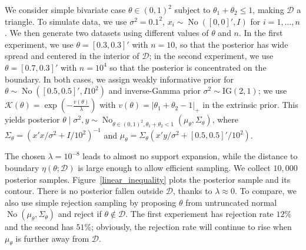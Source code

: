 \documentclass[10pt]{article}
\newcommand{\mc}[1]{\mathcal{#1}}
\DeclareMathOperator{\No}{No}
\DeclareMathOperator{\1}{\mathbbm{1}}
\begin{document}
We consider simple bivariate case $\theta \in (0,1)^2$ subject to $\theta_1+\theta_2\le 1$, making $\mc D$ a triangle. To simulate data, we use $\sigma^2=0.1^2$, $x_i\sim \No([0,0]',I)$ for $i=1,\ldots,n$. We then generate two datasets using different values of $\theta$ and $n$. In the first experiment, we use $\theta=[0.3,0.3]'$ with $n=10$, so that the posterior has wide spread and centered in the interior of $\mc D$; in the second experiment, we use $\theta=[0.7,0.3]'$ with $n=10^4$ so that the posterior is concentrated on the boundary. In both cases, we assign weakly informative prior for $\theta\sim \No([0.5, 0.5]',I10^2)$ and inverse-Gamma prior $\sigma^2\sim \text{IG}(2,1)$; we use $\mc K(\theta)=\exp( - \frac{v(\theta)}{\lambda})$ with $v(\theta)=|\theta_1+\theta_2-1|_{+}$ in the extrinsic prior. This yields posterior $\theta\mid \sigma^2,y \sim \No_{\theta\in(0,1)^2,\theta_1+\theta_2<1} \left( \mu_\theta, \Sigma_\theta\right)$, where $\Sigma_\theta=(x'x/\sigma^2+I/10^2)^{-1}$ and $\mu_\theta= \Sigma_\theta(x'y/\sigma^2 + [0.5,0.5]'/10^2)$. 

The chosen $\lambda=10^{-8}$ leads to almost no support expansion, while the distance to boundary $\eta(\theta;\mc D)$ is large enough to allow efficient sampling. We collect $10,000$ posterior samples. Figure~\ref{linear_inequality} plots the posterior sample and its contour. There is no posterior fallen outside $\mc D$, thanks to $\lambda\approx 0$. To compare, we also use simple rejection sampling by proposing $\theta$ from untruncated normal $\No \left( \mu_\theta, \Sigma_\theta\right)$ and reject if $\theta\not\in \mc D$. The first experiement has rejection rate $12\%$  and the second has $51\%$; obviously, the rejection rate will continue to rise when $\mu_\theta$ is further away from $\mc D$.
\end{document}
